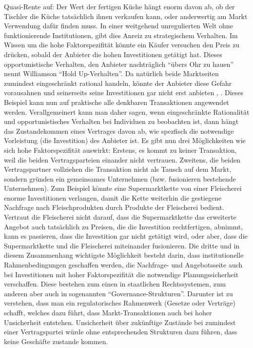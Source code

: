 Quasi-Rente auf: Der Wert der fertigen Küche hängt enorm davon ab, ob der Tischler die Küche tatsächlich ihnen verkaufen kann, oder anderwertig am Markt Verwendung dafür finden muss. In einer weitgehend unregulierten Welt ohne funktionierende Institutionen, gibt dies Anreiz zu strategischem Verhalten. Im Wissen um die hohe Faktorspezifität könnte ein Käufer versuchen den Preis zu drücken, sobald der Anbieter die hohen Investitionen getätigt hat. Dieses opportunistische Verhalten, den Anbieter nachträglich "`übers Ohr zu hauen"' nennt Williamson "`Hold Up-Verhalten"'. Da natürlich beide Marktseiten zumindest eingeschränkt rational handeln, könnte der Anbieter diese Gefahr vorausahnen und seinerseits seine Investitionen gar nicht erst anbieten \parencite[S. 88]{Voigt2009}, \parencite[S. 181]{Erlei2016}. Dieses Beispiel kann nun auf praktische alle denkbaren Transaktionen angewendet werden. Verallgemeinert kann man daher sagen, wenn eingeschränkte Rationalität und opportunistisches Verhalten bei Individuen zu beobachten ist, dann hängt das Zustandekommen eines Vertrages davon ab, wie spezfisch die notwendige Vorleistung (die Investition) des Anbieter ist. Es gibt nun drei Möglichkeiten wie sich hohe Faktorspezifität auswirkt: Erstens, es kommt zu keiner Transaktion, weil die beiden Vertragsparteien einander nicht vertrauen. Zweitens, die beiden Vertragspartner vollziehen die Transaktion nicht als Tausch auf dem Markt, sondern gründen ein gemeinsames Unternehmen (bzw. fusionieren bestehende Unternehmen). Zum Beispiel könnte eine Supermarktkette von einer Fleischerei enorme Investitionen verlangen, damit die Kette weiterhin die gestiegene Nachfrage nach Fleischprodukten durch Produkte der Fleischerei bedient. Vertraut die Fleischerei nicht darauf, dass die Supermarktkette das erweiterte Angebot auch tatsächlich zu Preisen, die die Investition rechtfertigen, abnimmt, kann es passieren, dass die Investition gar nicht getätigt wird, oder aber, dass die Supermarktkette und die Fleischerei miteinander fusionieren. Die dritte und in diesem Zusammenhang wichtigste Möglichkeit besteht darin, dass institutionelle Rahmenbedingungen geschaffen werden, die Nachfrage- und Angebotsseite auch bei Investitionen mit hoher Faktorspezifität die notwendige Planungssicherheit verschaffen. Diese bestehen zum einen in staatlichen Rechtssystemen, zum anderen aber auch in sogenannten "`Governance-Strukturen"'. Darunter ist zu verstehen, dass man ein regulatorisches Rahmenwerk (Gesetze oder Verträge) schafft, welches dazu führt, dass Markt-Transaktionen auch bei hoher Unsicherheit entstehen. Unsicherheit über zukünftige Zustände bei zumindest einer Vertragspartei würde ohne entsprechenden Strukturen dazu führen, dass keine Geschäfte zustande kommen.

